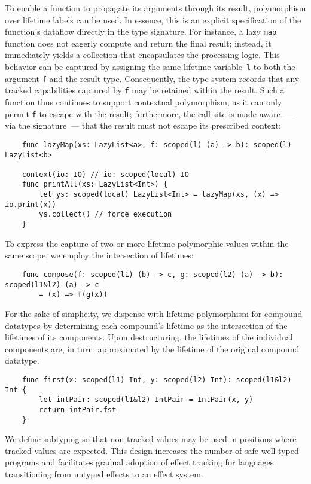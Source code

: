 \documentclass[acmsmall,review,screen]{acmart}
\begin{document}
To enable a function to propagate its arguments through its result, polymorphism over lifetime labels can be used.
In essence, this is an explicit specification of the function’s dataflow directly in the type signature. %
For instance, a lazy \texttt{map} function does not eagerly compute and return the final result; instead, it immediately yields a collection that encapsulates the processing logic.
This behavior can be captured by assigning the same lifetime variable~\texttt{l} to both the argument \texttt{f} and the result type.
Consequently, the type system records that any tracked capabilities captured by \texttt{f} may be retained within the result.
Such a function thus continues to support contextual polymorphism, as it can only permit \texttt{f} to escape with the result; furthermore, the call site is made aware~--- via the signature~--- that the result must not escape its prescribed context:
\begin{verbatim}
    func lazyMap(xs: LazyList<a>, f: scoped(l) (a) -> b): scoped(l) LazyList<b>

    context(io: IO) // io: scoped(local) IO
    func printAll(xs: LazyList<Int>) {
        let ys: scoped(local) LazyList<Int> = lazyMap(xs, (x) => io.print(x))
        ys.collect() // force execution
    }
\end{verbatim}

To express the capture of two or more lifetime-polymorphic values within the same scope, we employ the intersection of lifetimes:
\begin{verbatim}
    func compose(f: scoped(l1) (b) -> c, g: scoped(l2) (a) -> b): scoped(l1&l2) (a) -> c
        = (x) => f(g(x))
\end{verbatim}

For the sake of simplicity, we dispense with lifetime polymorphism for compound datatypes by determining each compound's lifetime as the intersection of the lifetimes of its components.
Upon destructuring, the lifetimes of the individual components are, in turn, approximated by the lifetime of the original compound datatype.
\begin{verbatim}
    func first(x: scoped(l1) Int, y: scoped(l2) Int): scoped(l1&l2) Int {
        let intPair: scoped(l1&l2) IntPair = IntPair(x, y)
        return intPair.fst
    }
\end{verbatim}

We define subtyping so that non-tracked values may be used in positions where tracked values are expected.
This design increases the number of safe well-typed programs and facilitates gradual adoption of effect tracking for languages transitioning from untyped effects to an effect system.
\end{document}
